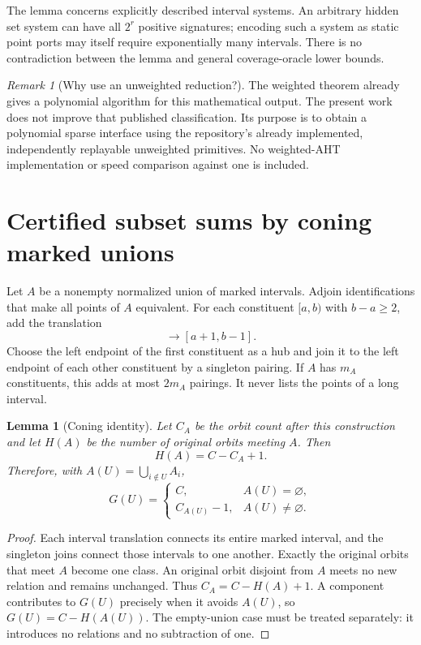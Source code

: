 \documentclass[11pt,letterpaper]{article}
\newtheorem{lemma}[theorem]{Lemma}
\theoremstyle{definition}\newtheorem{definition}[theorem]{Definition}
\theoremstyle{remark}\newtheorem{remark}[theorem]{Remark}
\begin{document}
The lemma concerns explicitly described interval systems. An arbitrary hidden set system can have all $2^r$ positive signatures; encoding such a system as static point ports may itself require exponentially many intervals. There is no contradiction between the lemma and general coverage-oracle lower bounds.

\begin{remark}[Why use an unweighted reduction?]
The weighted theorem already gives a polynomial algorithm for this mathematical output. The present work does not improve that published classification. Its purpose is to obtain a polynomial sparse interface using the repository's already implemented, independently replayable unweighted primitives. No weighted-AHT implementation or speed comparison against one is included.
\end{remark}

\section{Certified subset sums by coning marked unions}
\label{sec:coning}

Let $A$ be a nonempty normalized union of marked intervals. Adjoin identifications that make all points of $A$ equivalent. For each constituent $[a,b)$ with $b-a\ge2$, add the translation
\begin{equation}
[a,b-2]\longrightarrow[a+1,b-1].
\label{eq:cone}
\end{equation}
Choose the left endpoint of the first constituent as a hub and join it to the left endpoint of each other constituent by a singleton pairing. If $A$ has $m_A$ constituents, this adds at most $2m_A$ pairings. It never lists the points of a long interval.

\begin{lemma}[Coning identity]
\label{lem:cone}
Let $C_A$ be the orbit count after this construction and let $H(A)$ be the number of original orbits meeting $A$. Then
\[
H(A)=C-C_A+1.
\]
Therefore, with $A(U)=\bigcup_{i\notin U}A_i$,
\begin{equation}
G(U)=
\begin{cases}
C,&A(U)=\varnothing,\\
C_{A(U)}-1,&A(U)\ne\varnothing.
\end{cases}
\label{eq:Gcone}
\end{equation}
\end{lemma}
\begin{proof}
Each interval translation connects its entire marked interval, and the singleton joins connect those intervals to one another. Exactly the original orbits that meet $A$ become one class. An original orbit disjoint from $A$ meets no new relation and remains unchanged. Thus
$C_A=C-H(A)+1$. A component contributes to $G(U)$ precisely when it avoids $A(U)$, so $G(U)=C-H(A(U))$. The empty-union case must be treated separately: it introduces no relations and no subtraction of one.
\end{proof}
\end{document}

